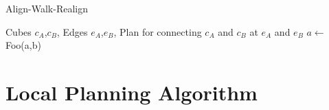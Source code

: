\begin{algorithm}
	\caption{Align-Walk-Realign}
	\label{alg:local_algo}
	\begin{algorithmic}
		\REQUIRE Cubes $c_A$,$c_B$, Edges $e_A$,$e_B$, 
		\ENSURE Plan for connecting $c_A$ and $c_B$ at $e_A$ and $e_B$
		\STATE $a \gets$ Foo(a,b)
	\end{algorithmic}
\end{algorithm}

\section{Local Planning Algorithm}
\label{sec:local_algo}